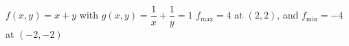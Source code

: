 {$f(x,y) = x+y$ with $g(x,y) = \dfrac{1}{x} + \dfrac{1}{y} = 1$
}
{$f_{\text{max}} = 4$ at $\left( 2,2 \right)$, and $f_{\text{min}} = -4$ at $\left( -2,-2 \right)$}
